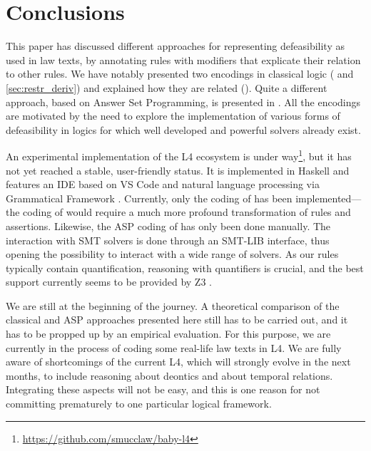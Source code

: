 \section{Conclusions}\label{sec:conclusions}

This paper has discussed different approaches for representing defeasibility
as used in law texts, by annotating rules with modifiers that explicate their
relation to other rules. We have notably presented two encodings in classical
logic ( and \ref{sec:restr_deriv}) and explained
how they are related (). Quite a different approach,
based on Answer Set Programming, is presented in
.  All the encodings are motivated by the need to explore the implementation of various forms of defeasibility in logics for which well developed and powerful solvers already exist.  

An experimental implementation of the L4 ecosystem is under
way\footnote{\url{https://github.com/smucclaw/baby-l4}}, but it has not yet
reached a stable, user-friendly status. It is implemented in Haskell and features
an IDE based on VS Code and natural language processing via Grammatical
Framework \citep{ranta_grammatical_2004}. Currently, only the coding of
 has been implemented---the coding of
 would require a much more profound transformation of
rules and assertions. Likewise, the ASP coding of 
has only been done manually. The interaction with SMT solvers is done through
an SMT-LIB \citep{BarFT_SMTLIB} interface, thus opening the possibility to
interact with a wide range of solvers. As our rules typically contain
quantification, reasoning with quantifiers is crucial, and the best support
currently seems to be provided by Z3 \citep{demoura_bjorner_z3_2008}.

We are still at the beginning of the journey. A theoretical comparison of the
classical and ASP approaches presented here still has to be carried out, and
it has to be propped up by an empirical evaluation. For this purpose, we are
currently in the process of coding some real-life law texts in L4. We are
fully aware of shortcomings of the current L4, which will strongly evolve in
the next months, to include reasoning about deontics and about temporal
relations. Integrating these aspects will not be easy, and this is one reason
for not committing prematurely to one particular logical framework.


